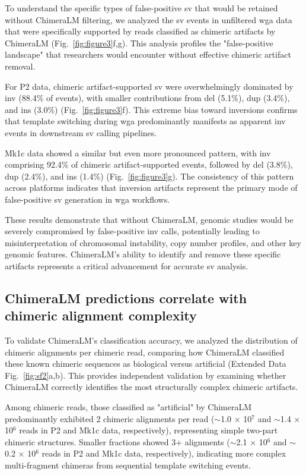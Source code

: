 \documentclass[pdflatex,sn-nature]{sn-jnl}%
\theoremstyle{thmstyleone}%
\theoremstyle{thmstyletwo}%
\theoremstyle{thmstylethree}%
\begin{document}
To understand the specific types of false-positive \gls{sv} that would be retained without ChimeraLM filtering, we analyzed the \gls{sv} events in unfiltered \gls{wga} data that were specifically supported by reads classified as chimeric artifacts by ChimeraLM (Fig.~\ref{fig:figure3}f,g).
This analysis profiles the "false-positive landscape" that researchers would encounter without effective chimeric artifact removal.

For P2 data, chimeric artifact-supported \gls{sv} were overwhelmingly dominated by \gls{inv} (88.4\% of events), with smaller contributions from \gls{del} (5.1\%), \gls{dup} (3.4\%), and \gls{ins} (3.0\%) (Fig.~\ref{fig:figure3}f).
This extreme bias toward inversions confirms that template switching during \gls{wga} predominantly manifests as apparent \gls{inv} events in downstream \gls{sv} calling pipelines.

Mk1c data showed a similar but even more pronounced pattern, with \gls{inv} comprising 92.4\% of chimeric artifact-supported events, followed by \gls{del} (3.8\%), \gls{dup} (2.4\%), and \gls{ins} (1.4\%) (Fig.~\ref{fig:figure3}g).
The consistency of this pattern across platforms indicates that inversion artifacts represent the primary mode of false-positive \gls{sv} generation in \gls{wga} workflows.

These results demonstrate that without ChimeraLM, genomic studies would be severely compromised by false-positive \gls{inv} calls, potentially leading to misinterpretation of chromosomal instability, copy number profiles, and other key genomic features.
ChimeraLM's ability to identify and remove these specific artifacts represents a critical advancement for accurate \gls{sv} analysis.

\subsection*{ChimeraLM predictions correlate with chimeric alignment complexity}

To validate ChimeraLM's classification accuracy, we analyzed the distribution of chimeric alignments per chimeric read, comparing how ChimeraLM classified these known chimeric sequences as biological versus artificial (Extended Data Fig.~\ref{fig:sf2}a,b).
This provides independent validation by examining whether ChimeraLM correctly identifies the most structurally complex chimeric artifacts.

Among chimeric reads, those classified as "artificial" by ChimeraLM predominantly exhibited 2 chimeric alignments per read ($\sim$1.0 $\times$ 10$^7$ and $\sim$1.4 $\times$ 10$^6$ reads in P2 and Mk1c data, respectively), representing simple two-part chimeric structures.
Smaller fractions showed 3+ alignments ($\sim$2.1 $\times$ 10$^6$ and $\sim$0.2 $\times$ 10$^6$ reads in P2 and Mk1c data, respectively), indicating more complex multi-fragment chimeras from sequential template switching events.
\end{document}
